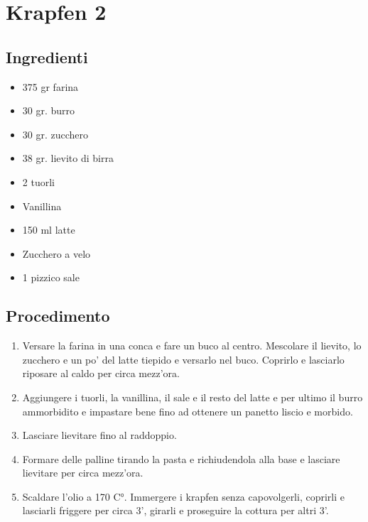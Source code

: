 \section{Krapfen 2}
\subsection{Ingredienti}
\begin{itemize}
\item 375 gr farina  
\item 30 gr. burro  
\item 30 gr. zucchero  
\item 38 gr. lievito di birra  
\item 2 tuorli  
\item Vanillina  
\item 150 ml latte  
\item Zucchero a velo  
\item 1 pizzico sale
\end{itemize}
\subsection{Procedimento}
\begin{enumerate}
\item  Versare la farina in una conca e fare un buco al centro. Mescolare il lievito, lo zucchero e un po' del latte tiepido e versarlo nel buco. Coprirlo e lasciarlo riposare al caldo per circa mezz'ora.  
\item  Aggiungere i tuorli, la vanillina, il sale e il resto del latte e per ultimo il burro ammorbidito e impastare bene fino ad ottenere un panetto liscio e morbido.  
\item  Lasciare lievitare fino al raddoppio.  
\item  Formare delle palline tirando la pasta e richiudendola alla base e lasciare lievitare per circa mezz'ora.  
\item  Scaldare l'olio a 170 C°. Immergere i krapfen senza capovolgerli, coprirli e lasciarli friggere per circa 3', girarli e proseguire la cottura per altri 3'.
\end{enumerate}
